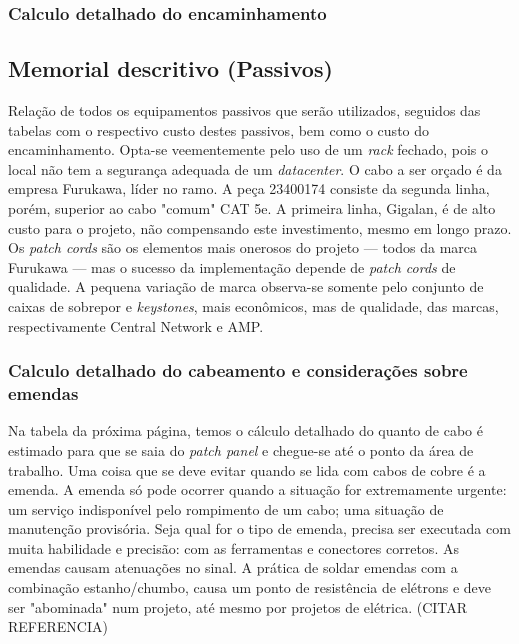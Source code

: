 \documentclass[	DIV=calc,%
							paper=a4,%
							fontsize=12pt,%
							onecolumn]{scrartcl}	 					%
\begin{document}


\subsubsection{Calculo detalhado do encaminhamento}








\subsection{Memorial descritivo (Passivos)}

Relação de todos os equipamentos passivos que serão utilizados, seguidos das tabelas com o respectivo custo destes passivos, bem como o custo do encaminhamento. Opta-se veementemente pelo uso de um \textit{rack} fechado, pois o local não tem a segurança adequada de um \textit{datacenter}. O cabo a ser orçado é da empresa Furukawa, líder no ramo. A peça 23400174 consiste da segunda linha, porém, superior ao cabo "comum" CAT 5e. A primeira linha, Gigalan, é de alto custo para o projeto, não compensando este investimento, mesmo em longo prazo. Os \textit{patch cords} são os elementos mais onerosos do projeto --- todos da marca Furukawa --- mas o sucesso da implementação depende de \textit{patch cords} de qualidade. A pequena variação de marca observa-se somente pelo conjunto de caixas de sobrepor e \textit{keystones}, mais econômicos, mas de qualidade, das marcas, respectivamente Central Network e AMP.





\subsubsection{Calculo detalhado do cabeamento e considerações sobre emendas}

Na tabela da próxima página, temos o cálculo detalhado do quanto de cabo é estimado para que se saia do \textit{patch panel} e chegue-se até o ponto da área de trabalho. Uma coisa que se deve evitar quando se lida com cabos de cobre é a emenda. A emenda só pode ocorrer quando a situação for extremamente urgente: um serviço indisponível pelo rompimento de um cabo; uma situação de manutenção provisória. Seja qual for o tipo de emenda, precisa ser executada com muita habilidade e precisão: com as ferramentas e conectores corretos. As emendas causam atenuações no sinal. A prática de soldar emendas com a combinação estanho/chumbo, causa um ponto de resistência de elétrons e deve ser "abominada" num projeto, até mesmo por projetos de elétrica. (CITAR REFERENCIA) 
\end{document}
